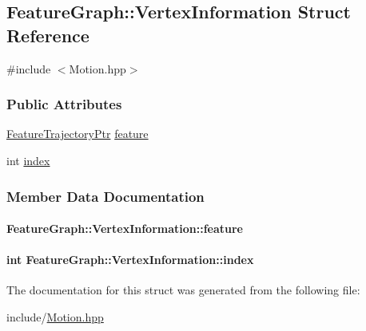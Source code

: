\hypertarget{structFeatureGraph_1_1VertexInformation}{\subsection{Feature\-Graph\-:\-:Vertex\-Information Struct Reference}
\label{structFeatureGraph_1_1VertexInformation}
}


{\ttfamily \#include $<$Motion.\-hpp$>$}

\subsubsection*{Public Attributes}
\begin{DoxyCompactItemize}
\item 
\hyperlink{Motion_8hpp_a86ae4681c45e5385d5543cff332f56f4}{Feature\-Trajectory\-Ptr} \hyperlink{structFeatureGraph_1_1VertexInformation_a909239bbabb81069006acea384429b44}{feature}
\item 
int \hyperlink{structFeatureGraph_1_1VertexInformation_a97fdc6a81841de2308d4a254e7117b2f}{index}
\end{DoxyCompactItemize}


\subsubsection{Member Data Documentation}
\hypertarget{structFeatureGraph_1_1VertexInformation_a909239bbabb81069006acea384429b44}{
\paragraph[{feature}]{ Feature\-Graph\-::\-Vertex\-Information\-::feature}}\label{structFeatureGraph_1_1VertexInformation_a909239bbabb81069006acea384429b44}
\hypertarget{structFeatureGraph_1_1VertexInformation_a97fdc6a81841de2308d4a254e7117b2f}{
\paragraph[{index}]{\setlength{\rightskip}{0pt plus 5cm}int Feature\-Graph\-::\-Vertex\-Information\-::index}}\label{structFeatureGraph_1_1VertexInformation_a97fdc6a81841de2308d4a254e7117b2f}


The documentation for this struct was generated from the following file\-:\begin{DoxyCompactItemize}
\item 
include/\hyperlink{Motion_8hpp}{Motion.\-hpp}\end{DoxyCompactItemize}
